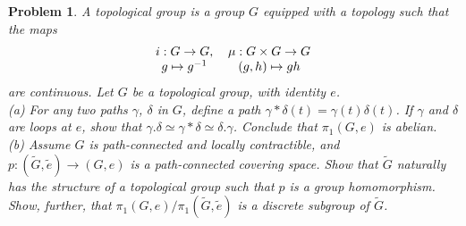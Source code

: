 \documentclass{article}
\newtheorem{problem}{Problem}
\begin{document}
\begin{problem}
A \emph{topological group} is a group $G$ equipped with a topology such that the maps
\[
\begin{tabular}{cc}
$i : G \to G$, & $\mu : G \times G \to G$\\
$g \mapsto g^{-1}$ & $(g,h) \mapsto gh$\\
\end{tabular}
\]
are continuous. Let $G$ be a topological group, with identity $e$.\\
(a) For any two paths $\gamma$, $\delta$ in $G$, define a path $\gamma * \delta (t) = \gamma (t) \delta (t)$. If $\gamma$ and $\delta$ are loops at $e$, show that $\gamma . \delta \simeq \gamma * \delta \simeq \delta . \gamma$. Conclude that $\pi_1(G,e)$ is abelian.\\
(b) Assume $G$ is path-connected and locally contractible, and $p: (\widetilde{G}, \widetilde{e}) \to (G,e)$ is a path-connected covering space. Show that $\widetilde{G}$ naturally has the structure of a topological group such that $p$ is a group homomorphism. Show, further, that $\pi_1(G,e)/\pi_1(\widetilde{G},\widetilde{e})$ is a discrete subgroup of $\widetilde{G}$.
\end{problem}
\end{document}
